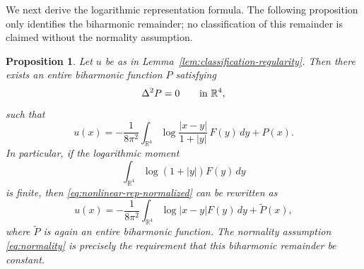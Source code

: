 \documentclass[11pt]{article}
\newtheorem{proposition}[theorem]{Proposition}
\numberwithin{equation}{section}
\begin{document}
We next derive the logarithmic representation formula. The following proposition only identifies the biharmonic remainder; no classification of this remainder is claimed without the normality assumption.

\begin{proposition}\label{prop:nonlinear-representation}
Let \(u\) be as in Lemma~\ref{lem:classification-regularity}. Then there exists an entire biharmonic function \(P\) satisfying
\[
\Delta^{2}P=0 \qquad \hbox{in } \mathbb R^{4},
\]
such that
\begin{equation}\label{eq:nonlinear-rep-normalized}
u(x)
=
-\frac{1}{8\pi^{2}}
\int_{\mathbb R^{4}}
\log\frac{|x-y|}{1+|y|}\,F(y)\,dy
+P(x).
\end{equation}
In particular, if the logarithmic moment
\[
\int_{\mathbb R^{4}}\log(1+|y|)F(y)\,dy
\]
is finite, then \eqref{eq:nonlinear-rep-normalized} can be rewritten as
\begin{equation}\label{eq:nonlinear-rep}
u(x)
=
-\frac{1}{8\pi^{2}}
\int_{\mathbb R^{4}}\log|x-y|F(y)\,dy
+\widetilde P(x),
\end{equation}
where \(\widetilde P\) is again an entire biharmonic function. The normality assumption \eqref{eq:normality} is precisely the requirement that this biharmonic remainder be constant.
\end{proposition}
\end{document}
